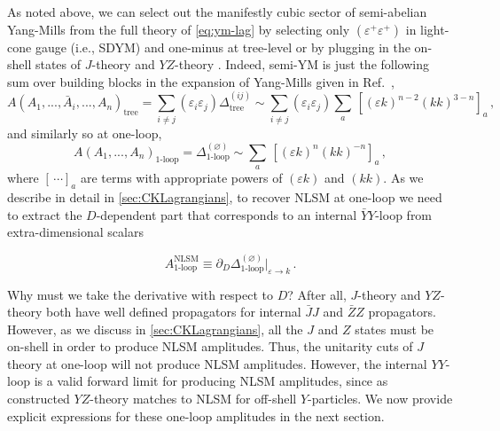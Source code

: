 \documentclass[11pt,letter]{article}
\begin{document}
As noted above, we can select out the manifestly cubic
sector of semi-abelian Yang-Mills from the full theory of \cref{eq:ym-lag} by selecting only $(\varepsilon^+\varepsilon^+)$ in light-cone gauge (i.e., SDYM) and one-minus at tree-level or by plugging in the on-shell states of $J$-theory \cite{Cheung:2020djz,Cheung:2021zvb} and
$YZ$-theory \cite{Cheung:2016prv}. Indeed, semi-YM is just the following sum over building blocks
in the expansion of Yang-Mills given in Ref.~\cite{Pavao:2022kog},
\begin{equation}
A(A_1,...,\bar{A}_i,...,A_n)_{\text{tree}} = \sum_{i\neq j} (\varepsilon_i \varepsilon_j) \Delta^{(ij)}_{\text{tree}} \sim \sum_{i\neq j} (\varepsilon_i \varepsilon_j)  \sum_a \,[(\varepsilon k)^{n-2} (kk)^{3-n}]_a\,,
\end{equation}
and similarly so at one-loop,
\begin{equation}
A(A_1,...,A_n)_{\text{1-loop}} = \Delta^{(\varnothing)}_{\text{1-loop}} \sim \sum_a\,[ (\varepsilon k)^{n} (kk)^{-n}]_a\,,
\end{equation}
where $[\,\cdots]_a$ are terms with appropriate powers of $(\varepsilon k)$ and $(kk)$. As we describe in detail in \cref{sec:CKLagrangians}, to recover NLSM at one-loop we need to extract the $D$-dependent part
that corresponds to an internal $\bar{Y}Y$-loop from extra-dimensional
scalars
\begin{eBox}
\begin{equation}
A^{\text{NLSM}}_{\text{1-loop}} \equiv \partial_D \Delta^{(\varnothing)}_{\text{1-loop}}\big|_{\varepsilon\rightarrow k}\, .
\end{equation}
\end{eBox}
Why must we take the derivative with respect to $D$? After all,
$J$-theory and $YZ$-theory both have well defined propagators for
internal $\bar{J}J$ and $\bar{Z}Z$ propagators. However, as we discuss
in \cref{sec:CKLagrangians}, all the $J$ and $Z$ states must be on-shell in order to
produce NLSM amplitudes. Thus, the unitarity cuts of $J$ theory at
one-loop will not produce NLSM amplitudes. However, the internal
$YY$-loop is a valid forward limit for producing NLSM amplitudes,
since as constructed $YZ$-theory matches to NLSM for off-shell
$Y$-particles. We now provide explicit expressions for these one-loop amplitudes in the next section.
\end{document}
